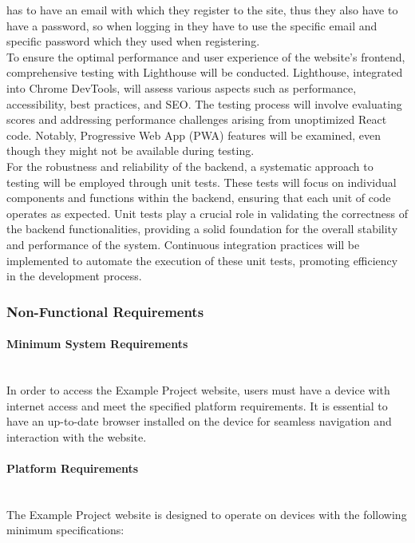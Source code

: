 \documentclass[12pt,a4paper]{article}
\begin{document}
\begin{spacing}{1.5}
    has to have an email with which they register to the site, thus they also have
    to have a password, so when logging in they have to use the specific email and
    specific password which they used when registering. \\ \indent To ensure the
    optimal performance and user experience of the website's frontend,
    comprehensive testing with Lighthouse will be conducted. Lighthouse, integrated
    into Chrome DevTools, will assess various aspects such as performance,
    accessibility, best practices, and SEO. The testing process will involve
    evaluating scores and addressing performance challenges arising from
    unoptimized React code. Notably, Progressive Web App (PWA) features will be
    examined, even though they might not be available during testing. \\ \indent
    For the robustness and reliability of the backend, a systematic approach to
    testing will be employed through unit tests. These tests will focus on
    individual components and functions within the backend, ensuring that each unit
    of code operates as expected. Unit tests play a crucial role in validating the
    correctness of the backend functionalities, providing a solid foundation for
    the overall stability and performance of the system. Continuous integration
    practices will be implemented to automate the execution of these unit tests,
    promoting efficiency in the development process.
    \subsubsection{Non-Functional Requirements}

    \paragraph{Minimum System Requirements} \mbox{} \\ \indent
    In order to access the Example Project website, users must have a device with internet access and meet the specified platform requirements. It is essential to have an up-to-date browser installed on the device for seamless navigation and interaction with the website.

    \paragraph{Platform Requirements} \mbox{} \\ \indent
    The Example Project website is designed to operate on devices with the following minimum specifications:


\end{spacing}
\end{document}
